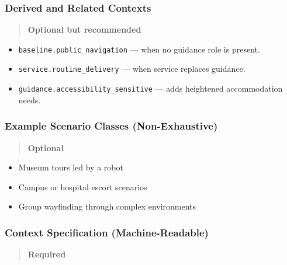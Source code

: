\documentclass[utf8]{frontiers_suppmat} %
\providecommand{\tightlist}{%
  \setlength{\itemsep}{0pt}\setlength{\parskip}{0pt}}
\begin{document}
\subsubsection{Derived and Related
Contexts}\label{derived-and-related-contexts}

\begin{quote}
\textbf{Optional but recommended}
\end{quote}

\begin{itemize}
\tightlist
\item
  \texttt{baseline.public\_navigation} --- when no
  guidance role is present.
\item
  \texttt{service.routine\_delivery} --- when service
  replaces guidance.
\item
  \texttt{guidance.accessibility\_sensitive} --- adds
  heightened accommodation needs.
\end{itemize}

\subsubsection{Example Scenario Classes
(Non-Exhaustive)}\label{example-scenario-classes-non-exhaustive}

\begin{quote}
\textbf{Optional}
\end{quote}

\begin{itemize}
\tightlist
\item
  Museum tours led by a robot
\item
  Campus or hospital escort scenarios
\item
  Group wayfinding through complex environments
\end{itemize}

\subsubsection{Context Specification
(Machine-Readable)}\label{context-specification-machine-readable}

\begin{quote}
\textbf{Required}
\end{quote}
\end{document}
